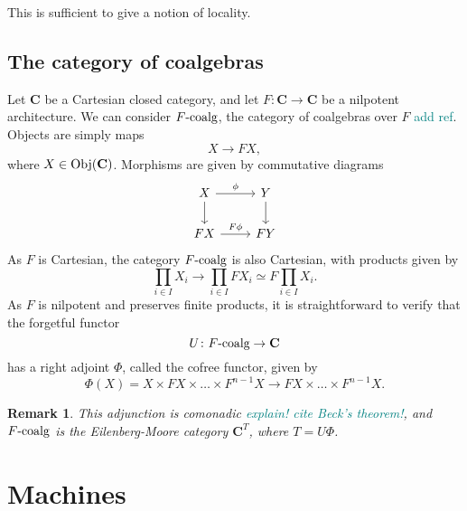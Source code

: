 \documentclass[12pt]{article}
\newtheorem{remark}{Remark}
\newcommand{\pietro}[1]{\textcolor{teal}{#1}}
\newcommand{\Obj}{{\textnormal{Obj}}}
\newcommand{\Cat}{{\mathbf{C}}}
\newcommand{\FCoalg}{{F\textnormal{-coalg}}}
\begin{document}
This is sufficient to give a notion of locality.



\subsection{The category of coalgebras}

Let $\Cat$ be a Cartesian closed category, and let $F\colon \Cat \rightarrow \Cat$ be a nilpotent architecture. We can consider $\FCoalg$, the category of coalgebras over $F$ \pietro{add ref}. Objects are simply maps
\begin{equation*}
    X \rightarrow F X,
\end{equation*}
where $X \in \Obj(\Cat)$. Morphisms are given by commutative diagrams
\begin{equation*}
    \begin{tikzcd}
        X \arrow[rightarrow]{d} \arrow[rightarrow]{r}{\phi}
        & Y \arrow[rightarrow]{d} \\
        FX \arrow[rightarrow]{r}{F \phi}
        & FY
    \end{tikzcd}
\end{equation*}
As $F$ is Cartesian, the category $\FCoalg$ is also Cartesian, with products given by
\begin{equation*}
    \prod_{i \in I} X_i \rightarrow \prod_{i \in I} F X_i \simeq F \prod_{i \in I} X_i.
\end{equation*}
As $F$ is nilpotent and preserves finite products, it is straightforward to verify that the forgetful functor
\begin{equation*}
    U \colon \FCoalg \rightarrow \Cat
\end{equation*}
has a right adjoint $\Phi$, called the cofree functor, given by
\begin{equation*}
    \Phi(X) = X \times F X \times \dots \times F^{n-1} X \rightarrow F X \times \dots \times F^{n-1} X.
\end{equation*}

\begin{remark}
    This adjunction is comonadic \pietro{explain! cite Beck's theorem!}, and $\FCoalg$ is the Eilenberg-Moore category $\Cat^T$, where $T = U\Phi$.
\end{remark}

\section{Machines}
\end{document}
